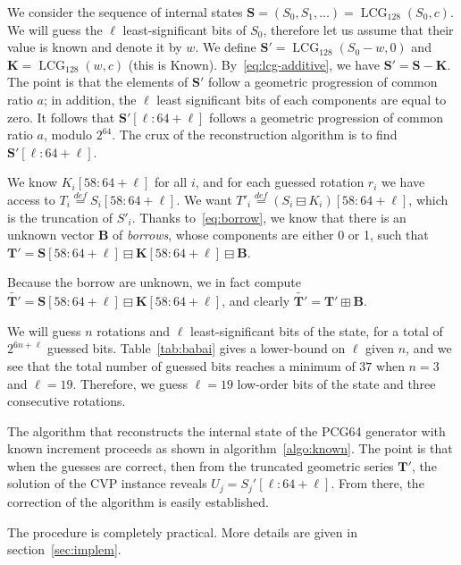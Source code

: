 \documentclass[submission,svgnames,journal=tosc]{iacrtrans}
\DeclareMathOperator{\LCG}{LCG}
\begin{document}
We consider the sequence of internal states
$\mathbf{S} = (S_0, S_1, \dots) = \LCG_{128}(S_0, c)$. We will guess the $\ell$
least-significant bits of $S_0$, therefore let us assume that their value is
known and denote it by $w$. We define $\mathbf{S}' = \LCG_{128}(S_0 - w, 0)$ and
$\mathbf{K} = \LCG_{128}(w, c)$ (this is Known). By~\eqref{eq:lcg-additive}, we
have $\mathbf{S}' = \mathbf{S} - \mathbf{K}$. The point is that the elements of
$\mathbf{S}'$ follow a geometric progression of common ratio $a$; in addition,
the $\ell$ least significant bits of each components are equal to zero. It
follows that $\mathbf{S}'[\ell:64+\ell]$ follows a geometric progression of
common ratio $a$, modulo $2^{64}$. The crux of the reconstruction algorithm is
to find $\mathbf{S}'[\ell:64+\ell]$.

We know $K_i[58:64+\ell]$ for all $i$, and for each guessed rotation $r_i$ we
have access to $T_i \stackrel{def}{=} S_i[58:64+\ell]$.  We want
$T'_i \stackrel{def}{=} (S_i \boxminus K_i)[58:64+\ell]$, which is the
truncation of $S'_i$. Thanks to~\eqref{eq:borrow}, we know that there is an
unknown vector $\mathbf{B}$ of \emph{borrows}, whose components are either 0 or
1, such that
$\mathbf{T'} = \mathbf{S}[58:64+\ell] \boxminus \mathbf{K}[58:64+\ell] \boxminus
\mathbf{B}$.

Because the borrow are unknown, we in fact compute
$\widetilde{\mathbf{T}'} = \mathbf{S}[58:64+\ell] \boxminus
\mathbf{K}[58:64+\ell]$, and clearly
$\widetilde{\mathbf{T}'} = \mathbf{T}' \boxplus \mathbf{B}$.

We will guess $n$ rotations and $\ell$ least-significant bits of the state, for
a total of $2^{6n + \ell}$ guessed bits. Table~\ref{tab:babai} gives a
lower-bound on $\ell$ given $n$, and we see that the total number of guessed
bits reaches a minimum of $37$ when $n=3$ and $\ell=19$. Therefore, we guess
$\ell = 19$ low-order bits of the state and three consecutive rotations.

The algorithm that reconstructs the internal state of the \textsf{PCG64}
generator with known increment proceeds as shown in
algorithm~\ref{algo:known}. The point is that when the guesses are correct, then
from the truncated geometric series $\mathbf{T'}$, the solution of the CVP
instance reveals $U_j = S_j'[\ell:64+\ell]$. From there, the correction of the
algorithm is easily established.

The procedure is completely practical. More details are given in section~\ref{sec:implem}.
\end{document}
